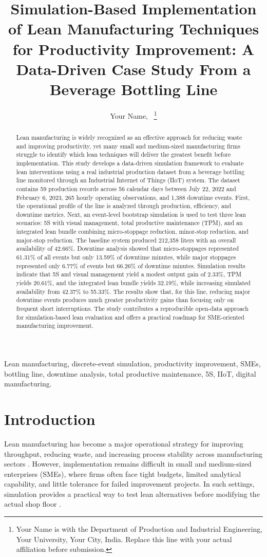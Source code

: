 \documentclass[journal]{IEEEtran}
\title{Simulation-Based Implementation of Lean Manufacturing Techniques for Productivity Improvement: A Data-Driven Case Study From a Beverage Bottling Line}
\author{
    Your Name,~\IEEEmembership{Student Member, IEEE}
    \thanks{Your Name is with the Department of Production and Industrial Engineering, Your University, Your City, India. Replace this line with your actual affiliation before submission.}
}
\begin{document}
\maketitle

\begin{abstract}
Lean manufacturing is widely recognized as an effective approach for reducing waste and improving productivity, yet many small and medium-sized manufacturing firms struggle to identify which lean techniques will deliver the greatest benefit before implementation. This study develops a data-driven simulation framework to evaluate lean interventions using a real industrial production dataset from a beverage bottling line monitored through an Industrial Internet of Things (IIoT) system. The dataset contains 59 production records across 56 calendar days between July 22, 2022 and February 6, 2023, 265 hourly operating observations, and 1,388 downtime events. First, the operational profile of the line is analyzed through production, efficiency, and downtime metrics. Next, an event-level bootstrap simulation is used to test three lean scenarios: 5S with visual management, total productive maintenance (TPM), and an integrated lean bundle combining micro-stoppage reduction, minor-stop reduction, and major-stop reduction. The baseline system produced 212,358 liters with an overall availability of 42.66\%. Downtime analysis showed that micro-stoppages represented 61.31\% of all events but only 13.59\% of downtime minutes, while major stoppages represented only 6.77\% of events but 66.26\% of downtime minutes. Simulation results indicate that 5S and visual management yield a modest output gain of 2.33\%, TPM yields 20.61\%, and the integrated lean bundle yields 32.19\%, while increasing simulated availability from 42.37\% to 55.33\%. The results show that, for this line, reducing major downtime events produces much greater productivity gains than focusing only on frequent short interruptions. The study contributes a reproducible open-data approach for simulation-based lean evaluation and offers a practical roadmap for SME-oriented manufacturing improvement.
\end{abstract}

\begin{IEEEkeywords}
Lean manufacturing, discrete-event simulation, productivity improvement, SMEs, bottling line, downtime analysis, total productive maintenance, 5S, IIoT, digital manufacturing.
\end{IEEEkeywords}

\section{Introduction} 
Lean manufacturing has become a major operational strategy for improving throughput, reducing waste, and increasing process stability across manufacturing sectors \cite{belekoukias2014lean}. However, implementation remains difficult in small and medium-sized enterprises (SMEs), where firms often face tight budgets, limited analytical capability, and little tolerance for failed improvement projects. In such settings, simulation provides a practical way to test lean alternatives before modifying the actual shop floor \cite{yu2021sme, frecassetti2023italian}.
\end{document}
